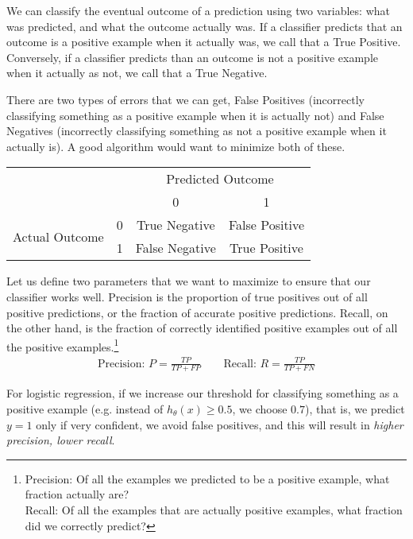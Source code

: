 \documentclass[letterpaper,10pt]{article}
\begin{document}
We can classify the eventual outcome of a prediction using two variables: what was predicted, and what the outcome actually was. If a classifier predicts that an outcome is a positive example when it actually was, we call that a True Positive. Conversely, if a classifier predicts than an outcome is not a positive example when it actually as not, we call that a True Negative.

There are two types of errors that we can get, False Positives (incorrectly classifying something as a positive example when it is actually not) and False Negatives (incorrectly classifying something as not a positive example when it actually is). A good algorithm would want to minimize both of these. 

\begin{center}
\begin{tabular}{cc|c|c|}
\multicolumn{2}{c}{} & \multicolumn{2}{c}{Predicted Outcome} \\
\multicolumn{2}{c}{} &  \multicolumn{1}{c}{0}  &  \multicolumn{1}{c}{1}  \\
\cline{3-4}
\multirow{2}{*}{Actual Outcome} & 0 & True Negative & False Positive \\
\cline{3-4}
& 1 & False Negative & True Positive \\
\cline{3-4}
\end{tabular}
\end{center}

Let us define two parameters that we want to maximize to ensure that our classifier works well. Precision is the proportion of true positives out of all positive predictions, or the fraction of accurate positive predictions. Recall, on the other hand, is the fraction of correctly identified positive examples out of all the positive examples.\footnote{
Precision: Of all the examples we predicted to be a positive example, what fraction actually are?\\
Recall: Of all the examples that are actually positive examples, what fraction did we correctly predict?}
\begin{align}
\text{Precision: } P = \frac{TP}{TP + FP} \qquad \text{Recall: } R = \frac{TP}{TP + FN} 
\end{align}

For logistic regression, if we increase our threshold for classifying something as a positive example (e.g. instead of $h_\theta (x) \geq 0.5$, we choose $0.7$), that is, we predict $y=1$ only if very confident, we avoid false positives, and this will result in \textit{higher precision, lower recall}.
\end{document}
